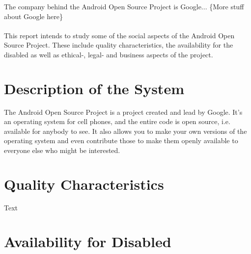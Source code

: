 \documentclass[conference]{IEEEtran}
\begin{document}

The company behind the Android Open Source Project is Google... \{More stuff about Google here\}\\
\\
This report intends to study some of the social aspects of the Android Open Source Project. These include quality characteristics, the availability for the disabled as well as ethical-, legal- and business aspects of the project. 


\section{Description of the System}
\label{system}

The Android Open Source Project is a project created and lead by Google. It's an operating system for cell phones, and the entire code is open source, i.e. available for anybody to see. It also allows you to make your own versions of the operating system and even contribute those to make them openly available to everyone else who might be interested.


\section{Quality Characteristics}
\label{quality}

{Text}


\section{Availability for Disabled}
\label{availability}
\end{document}
